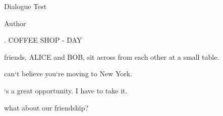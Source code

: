 \documentclass{scrartcl} %
\begin{document}
    
        \begin{titlepage}
    

    \titletextDual Dialogue Test
    

    \authornameTest Author
    

    
        \newpage
    

    
        \sceneheadINT. COFFEE SHOP - DAY
    

    
        \vspace{\baselineskip} %
    

    
        \actionTwo friends, ALICE and BOB, sit across from each other at a small table.
    

    
        \vspace{\baselineskip} %
    

    
        \characterALICE
    

    
        \dialogueI can`t believe you`re moving to New York.
    

    
        \vspace{\baselineskip} %
    

    
        \characterBOB
    

    
        \dialogueIt`s a great opportunity. I have to take it.
    

    
        \vspace{\baselineskip} %
    

    
        \begin{dualdialogue} %
            \leftcol
    

    
        \characterALICE
    

    
        \dialogueBut what about our friendship?
    

    
        \vspace{\baselineskip} %
    


\end{dualdialogue}
\end{titlepage}
\end{document}
